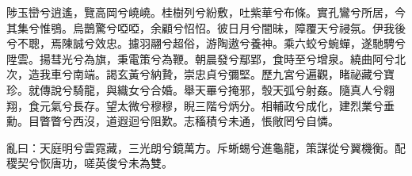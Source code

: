 
\begin{pinyinscope}
陟玉巒兮逍遙，覽高岡兮嶢嶢。桂樹列兮紛敷，吐紫華兮布條。實孔鸞兮所居，今其集兮惟鴞。烏鵲驚兮啞啞，余顧兮怊怊。彼日月兮闇昧，障覆天兮祲氛。伊我後兮不聰，焉陳誠兮效忠。攄羽翮兮超俗，游陶遨兮養神。乘六蛟兮蜿蟬，遂馳騁兮陞雲。揚彗光兮為旗，秉電策兮為鞭。朝晨發兮鄢郢，食時至兮增泉。繞曲阿兮北次，造我車兮南端。謁玄黃兮納贄，崇忠貞兮彌堅。歷九宮兮遍觀，睹祕藏兮寶珍。就傳說兮騎龍，與織女兮合婚。舉天罼兮掩邪，彀天弧兮射姦。隨真人兮翱翔，食元氣兮長存。望太微兮穆穆，睨三階兮炳分。相輔政兮成化，建烈業兮垂勳。目瞥瞥兮西沒，道遐迴兮阻歎。志稸積兮未通，悵敞罔兮自憐。

亂曰：天庭明兮雲霓藏，三光朗兮鏡萬方。斥蜥蜴兮進龜龍，策謀從兮翼機衡。配稷契兮恢唐功，嗟英俊兮未為雙。


\end{pinyinscope}